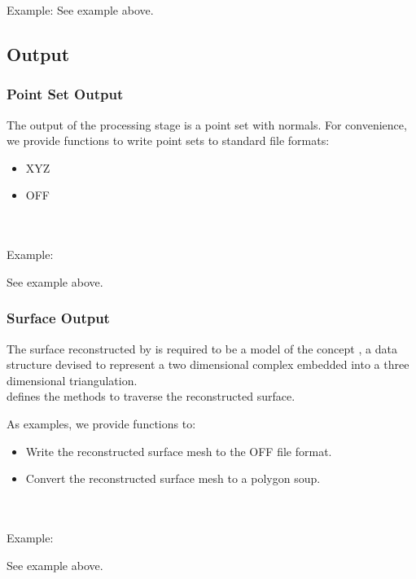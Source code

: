Example:
See  example above.


\subsection{Output}

\subsubsection{Point Set Output}

The output of the processing stage is a point set with normals.
For convenience, we provide functions to write point sets to standard file formats:
\begin{itemize}
\item XYZ
\item OFF
\end{itemize}

  \\
  \\

Example:

See  example above.


\subsubsection{Surface Output}

The surface reconstructed by 
is required to be a model of the concept
,
a data structure devised to represent a two dimensional
complex embedded into a three dimensional triangulation.\\

 defines the methods to traverse the reconstructed surface.

As examples, we provide functions to:

\begin{itemize}
\item Write the reconstructed surface mesh to the
      OFF file format.
\item Convert the reconstructed surface mesh to a
      polygon soup.
\end{itemize}

  \\
  \\

Example:

See  example above.






